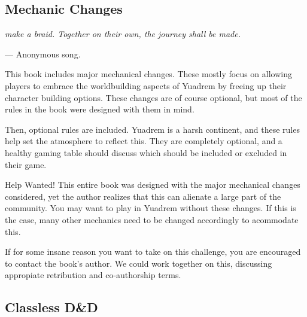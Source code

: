 \begin{linenumbers}

\chapter{Mechanic Changes}
\textit{make a braid.
Together on their own, the journey shall be made.}

\hspace*{\fill} --- Anonymous song.

This book includes major mechanical changes.
These mostly focus on allowing players to embrace the worldbuilding aspects of Yuadrem by freeing up their character building options.
These changes are of course optional, but most of the rules in the book were designed with them in mind.

Then, optional rules are included.
Yuadrem is a harsh continent, and these rules help set the atmosphere to reflect this.
They are completely optional, and a healthy gaming table should discuss which should be included or excluded in their game.

\begin{DndComment}[float=h]{Help Wanted!}
    This entire book was designed with the major mechanical changes considered, yet the author realizes that this can alienate a large part of the community.
    You may want to play in Yuadrem without these changes.
    If this is the case, many other mechanics need to be changed accordingly to acommodate this.

    If for some insane reason you want to take on this challenge, you are encouraged to contact the book's author.
    We could work together on this, discussing appropiate retribution and co-authorship terms.
\end{DndComment}



\section{Classless D\&D}


\end{linenumbers}
